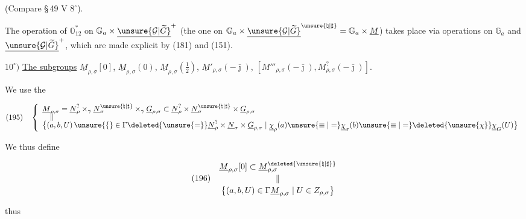 (Compare \S\,49 \uline{$\mathrm V$} $8^{\circ}$).

The operation of $\mathbb O_{12}^{*}$ on
$\mathbb G_a\times\underline{\unsure{\mathcal G|\widetilde G}}^{+}$
(the one on $\mathbb G_a\times\underline{\unsure{\mathcal G|\widetilde G}}^{\unsure{\natural|\sharp}}
=\mathbb G_a\times\underline M$) takes place via operations on
$\mathbb G_a$ and $\underline{\unsure{\mathcal G|\widetilde G}}^{+}$, which are made explicit
 by (181) and (151).



$10^{\circ})$ \uline{The subgroups}
$\underline M_{\rho,\sigma}[0]$, $\underline M_{\rho,\sigma}(0)$,
$\underline M_{\rho,\sigma}(\frac12)$,
$\underline M'_{\rho,\sigma}(-\bar\jmath)$,
$[M'''_{\rho,\sigma}(-\bar\jmath),M^{?}_{\rho,\sigma}(-\bar\jmath)]$.

We use the 

\[
(195)\quad
\left\{\begin{array}{l}
\underline M_{\rho,\sigma}
=\underline N_\rho^{?}\times_\gamma
 \underline N_\sigma^{\unsure{\natural|\sharp}}\times_\gamma
 \underline G_{\rho,\sigma}
\subset\underline N_\rho^{?}\times
 \underline N_\sigma^{\unsure{\natural|\sharp}}\times
 \underline G_{\rho,\sigma}
\\[-2pt]
\quad\Vert
\\[-2pt]
\bigl\{(a,b,U)\,\unsure{\{}\in
 \Gamma\deleted{\unsure{=}}\underline N_\rho^{?}
 \times\underline N_\sigma\times\underline G_{\rho,\sigma}
 \mid\underline\chi_\rho(a)\unsure{\equiv|=}
 \underline\chi_\sigma(b)\unsure{\equiv|=}
 \deleted{\unsure{\chi}}\underline\chi_G(U)\bigr\}
\end{array}\right.
\]

We thus define

\[
(196)\quad\begin{gathered}
\underline M_{\rho,\sigma}[0]\subset
\underline M_{\rho,\sigma}^{\deleted{\unsure{\natural|\sharp}}}
\\[-2pt]
\Vert
\\[-2pt]
\bigl\{(a,b,U)\in\Gamma\underline M_{\rho,\sigma}
 \mid U\in Z_{\rho,\sigma}\bigr\}
\end{gathered}
\]


thus

